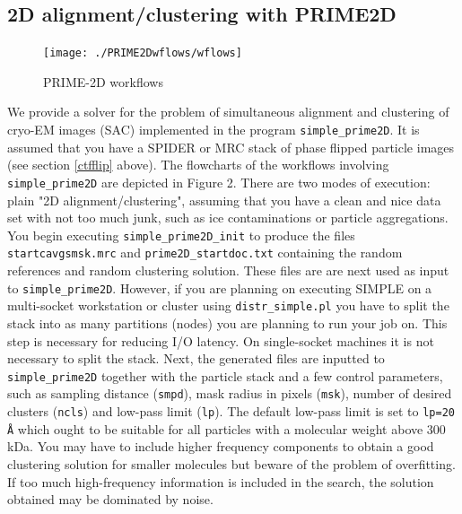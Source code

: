\documentclass[a4paper,11pt]{article}
\newcommand{\prgname}[1]{\textcolor{NavyBlue}{\texttt{#1}}}
\begin{document}
\subsection{2D alignment/clustering with PRIME2D}
\label{prime2D}
\begin{figure}
\texttt{[image: ./PRIME2Dwflows/wflows]}
\caption{PRIME-2D workflows}
\end{figure}
We provide a solver for the problem of simultaneous alignment and clustering of cryo-EM images (SAC) implemented in the program \prgname{simple\_prime2D}. It is assumed that you have a SPIDER or MRC stack of phase flipped particle images (see section \ref{ctfflip} above). The flowcharts of the workflows involving \prgname{simple\_prime2D} are depicted in Figure 2. There are two modes of execution: plain "2D alignment/clustering", assuming that you have a clean and nice data set with not too much junk, such as ice contaminations or particle aggregations. You begin executing \prgname{simple\_prime2D\_init} to produce the files \texttt{startcavgsmsk.mrc} and \texttt{prime2D\_startdoc.txt} containing the random references and random clustering solution. These files are are next used as input to \prgname{simple\_prime2D}. However, if you are planning on executing SIMPLE on a multi-socket workstation or cluster using \prgname{distr\_simple.pl} you have to split the stack into as many partitions (nodes) you are planning to run your job on. This step is necessary for reducing I/O latency. On single-socket machines it is not necessary to split the stack. Next, the generated files are inputted to \prgname{simple\_prime2D} together with the particle stack and a few control parameters, such as sampling distance (\texttt{smpd}), mask radius in pixels (\texttt{msk}), number of desired clusters (\texttt{ncls}) and low-pass limit (\texttt{lp}). The default low-pass limit is set to \texttt{lp=20 \AA{}} which ought to be suitable for all particles with a molecular weight above 300 kDa. You may have to include higher frequency components to obtain a good clustering solution for smaller molecules but beware of the problem of overfitting. If too much high-frequency information is included in the search, the solution obtained may be dominated by noise.
\end{document}
